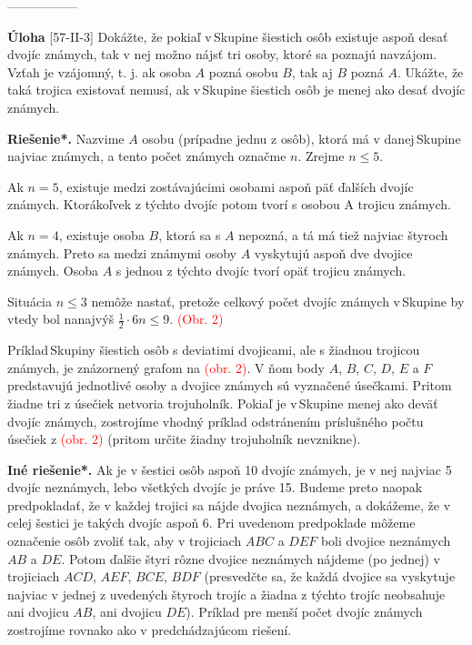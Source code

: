 \documentclass{article}
\newcommand{\rieh}{\textbf{Riešenie*.} }
\newcommand\todo[1]{\noindent\textcolor{red}{(#1)}}
\newcommand{\problem}[4]{
  \begin{tcolorbox}[breakable,notitle,boxrule=0pt,colback=light-gray,colframe=light-gray]
    \textbf{Úloha}
    [#1] #3
  \end{tcolorbox}
  \noindent#4
}
\begin{document}
-----------------

\problem{57-II-3}{}{
Dokážte, že pokiaľ v\,Skupine šiestich osôb existuje aspoň desať dvojíc známych, tak
v nej možno nájsť tri osoby, ktoré sa poznajú navzájom. Vzťah \uv{poznať sa} je vzájomný,
t. j. ak osoba $A$ pozná osobu $B$, tak aj $B$ pozná $A$. Ukážte, že taká trojica existovať
nemusí, ak v\,Skupine šiestich osôb je menej ako desať dvojíc známych.
}{
\rieh Nazvime $A$ osobu (prípadne jednu z osôb), ktorá má v danej\,Skupine najviac
známych, a tento počet známych označme $n$. Zrejme $n\leq 5$.

Ak $n = 5$, existuje medzi zostávajúcimi osobami aspoň päť ďalších dvojíc známych. Ktorákoľvek z týchto dvojíc potom tvorí s osobou A trojicu známych.

Ak $n = 4$, existuje osoba $B$, ktorá sa s $A$ nepozná, a tá má tiež najviac štyroch
známych. Preto sa medzi známymi osoby $A$ vyskytujú aspoň dve dvojice známych.
Osoba $A$ s jednou z týchto dvojíc tvorí opäť trojicu známych.

Situácia $n\leq 3$ nemôže nastať, pretože celkový počet dvojíc známych v\,Skupine by
vtedy bol nanajvýš $\frac{1}{2}\cdot 6n \leq 9$.
\todo{Obr. 2}

Príklad\,Skupiny šiestich osôb s deviatimi dvojicami, ale s žiadnou trojicou známych,
je znázornený grafom na \todo{obr. 2}. V ňom body $A$, $B$, $C$, $D$, $E$ a $F$ predstavujú jednotlivé osoby a dvojice známych sú vyznačené úsečkami. Pritom žiadne tri z úsečiek netvoria
trojuholník. Pokiaľ je v\,Skupine menej ako deväť dvojíc známych, zostrojíme vhodný
príklad odstránením príslušného počtu úsečiek z \todo{obr. 2} (pritom určite žiadny trojuholník
nevznikne).

\textbf{Iné riešenie*.} Ak je v šestici osôb aspoň 10 dvojíc známych, je v nej najviac 5 dvojíc neznámych, lebo všetkých dvojíc je práve 15. Budeme preto naopak predpokladať, že v každej trojici sa nájde dvojica neznámych, a dokážeme, že v celej šestici je takých dvojíc aspoň 6. Pri uvedenom predpoklade môžeme označenie osôb zvoliť tak, aby v trojiciach $ABC$ a $DEF$ boli dvojice neznámych $AB$ a $DE$. Potom ďalšie štyri rôzne dvojice neznámych nájdeme (po jednej) v trojiciach $ACD$, $AEF$, $BCE$, $BDF$ (presvedčte sa, že každá dvojice sa vyskytuje najviac v jednej z uvedených štyroch trojíc a žiadna z týchto trojíc neobsahuje ani dvojicu $AB$, ani dvojicu $DE$). Príklad pre menší počet dvojíc známych zostrojíme rovnako ako v predchádzajúcom riešení.
}
\end{document}
